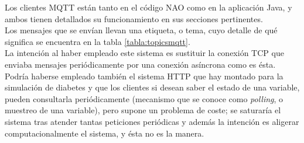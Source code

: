\documentclass[12pt,spanish,listoffigures,listoftables]{tfgetsinf}
\begin{document}
Los clientes MQTT están tanto en el código NAO como en la aplicación Java, y ambos tienen detallados su funcionamiento en sus secciones pertinentes. \\

Los mensajes que se envían llevan una etiqueta, o tema, cuyo detalle de qué significa se encuentra en la tabla \ref{tabla:topicsmqtt}. \\

La intención al haber empleado este sistema es sustituir la conexión TCP que enviaba mensajes periódicamente por una conexión asíncrona como es ésta. Podría haberse empleado también el sistema HTTP que hay montado para la simulación de diabetes y que los clientes si desean saber el estado de una variable, pueden consultarla periódicamente (mecanismo que se conoce como \textit{polling}, o muestreo de una variable), pero supone un problema de coste; se saturaría el sistema tras atender tantas peticiones periódicas y además la intención es aligerar computacionalmente el sistema, y ésta no es la manera. \\
\end{document}
